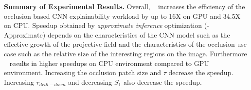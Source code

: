 \vspace{2mm}
\noindent \textbf{Summary of Experimental Results.}
Overall, \system~ increases the efficiency of the occlusion based CNN explainability workload by up to 16X on GPU and 34.5X on CPU.
Speedup obtained by \textit{approximate inference} optimization (\system-Approximate) depends on the characteristics of the CNN model such as the effective growth of the projective field and the characteristics of the occlusion use case such as the relative size of the interesting regions on the image.
Furthermore \system~ results in higher speedups on CPU environment compared to GPU environment.
Increasing the occlusion patch size and $\tau$ decrease the speedup.
Increasing $r_{drill-down}$ and decreasing $S_1$ also decrease the speedup.

